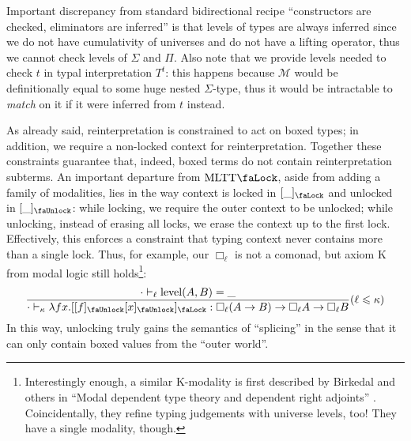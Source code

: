 Important discrepancy from standard bidirectional
recipe ``constructors are checked, eliminators are
inferred'' is that levels of types are always inferred
since we do not have cumulativity of universes and do
not have a lifting operator, thus we cannot check
levels of $\Sigma$ and $\Pi$. Also note that we provide
levels needed to check $t$ in typal interpretation
$T^t$: this happens because $\mathcal{M}$ would be
definitionally equal to some huge nested $\Sigma$-type,
thus it would be intractable to \textit{match} on it if
it were inferred from $t$ instead.

As already said, reinterpretation is constrained to act
on boxed types; in addition, we require a non-locked
context for reinterpretation. Together these constraints
guarantee that, indeed, boxed terms do not contain
reinterpretation subterms. An important departure from
$\mathrm{MLTT}\text{\faLock}$\cite{Gratzer2019}, aside
from adding a family of modalities, lies in the way
context is locked in $[\_]_\text{\faLock}$ and unlocked
in $[\_]_\text{\faUnlock}$: while locking, we require
the outer context to be unlocked; while unlocking,
instead of erasing all locks, we erase the context up
to the first lock. Effectively, this enforces a
constraint that typing context never contains more than
a single lock. Thus, for example, our $\Box_\ell$ is
not a comonad, but axiom K from modal logic still
holds\footnote{Interestingly enough, a similar
K-modality is first described by Birkedal and
others in ``Modal dependent type theory and dependent
right adjoints'' \cite{Birkedal2020}. Coincidentally,
they refine typing judgements with universe levels,
too! They have a single modality, though.}:
\[
    \dfrac{\cdot\vdash_\ell\mathrm{level}(A,B)=\_}{
        \cdot\vdash_\kappa\lambda f x.[[f
        ]_\text{\faUnlock}[x]_\text{\faUnlock}
        ]_\text{\faLock}:\Box_\ell(A\to B)\to
            \Box_\ell A\to\Box_\ell B
    }(\ell\leqslant\kappa)
\]
In this way, unlocking truly gains the semantics of
``splicing'' in the sense that it can only contain
boxed values from the ``outer world''.

